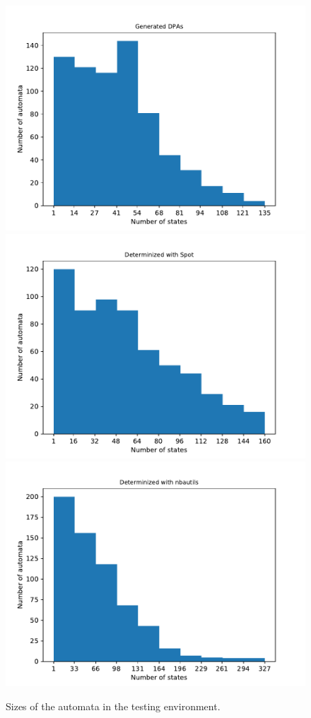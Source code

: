 \begin{figure}
\begin{minipage}{0.49\textwidth}
		\caption{Sizes of the automata in the testing environment.}
		\label{fig:rawstats:rawstats_size}
	\end{minipage}
	\hfill
	\begin{minipage}{0.49\textwidth}
		\includegraphics[page=2,height=.3\textheight]{../data/analysis/rawstats_gendet.pdf} 
		\includegraphics[page=2,height=.3\textheight]{../data/analysis/rawstats_detspot.pdf} 
		\includegraphics[page=2,height=.3\textheight]{../data/analysis/rawstats_detnbaut.pdf}

\end{minipage}
\end{figure}
